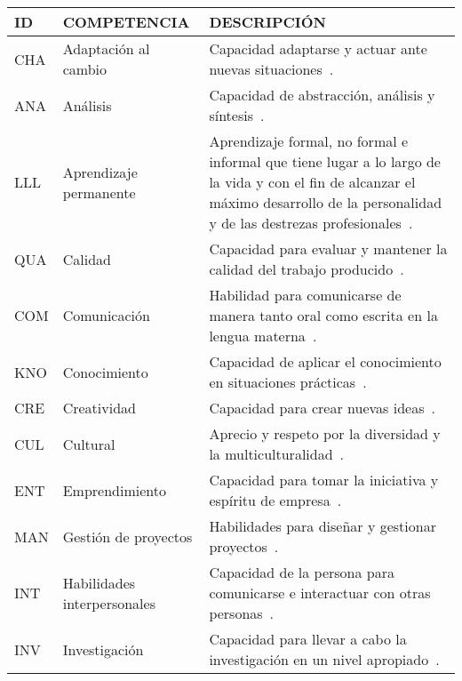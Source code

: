 \begin{landscape}
\pagestyle{empty}

  \begin{center}
  \setlength\tabcolsep{2.5pt}
\begin{longtable}{| L{1cm} | L{6cm} | L{15.2cm} |}
    \hline
    ID & COMPETENCIA & DESCRIPCIÓN \\
    \hline
    \hline
    CHA & Adaptación al cambio & Capacidad adaptarse y actuar ante nuevas situaciones~\cite{gonzalez2005tuning}.\\
    \hline
    ANA & Análisis & Capacidad de abstracción, análisis y síntesis~\cite{gonzalez2005tuning}.\\
    \hline
    LLL & Aprendizaje permanente & Aprendizaje formal, no formal e informal que tiene lugar a lo largo de la vida y con el fin de alcanzar el máximo desarrollo de la personalidad y de las destrezas profesionales~\cite{bernheim2010educacion}. \\
    \hline
    QUA & Calidad & Capacidad para evaluar y mantener la calidad del trabajo producido~\cite{gonzalez2005tuning}.\\
    \hline
    COM & Comunicación & Habilidad para comunicarse de manera tanto oral como escrita en la lengua materna~\cite{gonzalez2005tuning}. \\
    \hline
    KNO & Conocimiento & Capacidad de aplicar el conocimiento en situaciones prácticas~\cite{gonzalez2005tuning}. \\
    \hline
    CRE & Creatividad & Capacidad para crear nuevas ideas~\cite{gonzalez2005tuning}. \\
    \hline
    CUL & Cultural & Aprecio y respeto por la diversidad y la multiculturalidad~\cite{gonzalez2005tuning}. \\
    \hline
    ENT & Emprendimiento & Capacidad para tomar la iniciativa y espíritu de empresa~\cite{gonzalez2005tuning}. \\
    \hline
    MAN & Gestión de proyectos & Habilidades para diseñar y gestionar proyectos~\cite{gonzalez2005tuning}. \\
    \hline
    INT & Habilidades interpersonales & Capacidad de la persona para comunicarse e interactuar con otras personas~\cite{gonzalez2005tuning}. \\ %
    \hline    
    INV & Investigación & Capacidad para llevar a cabo la investigación en un nivel apropiado~\cite{gonzalez2005tuning}.  \\
    \hline 

\end{longtable}
\end{center}
\end{landscape}
